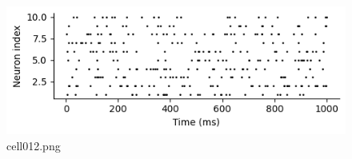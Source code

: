 \begin{figure}[ht]
	\centering
	\includegraphics[scale=0.8, max width=\linewidth]{./fig/neuron-model/isi/cell012.png}
	\caption{cell012.png}
	\label{cell012.png}
\end{figure}